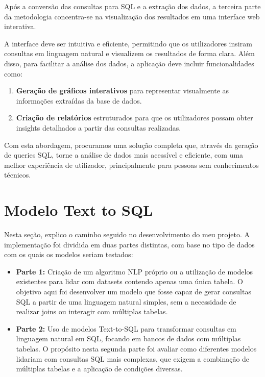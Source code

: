 \documentclass{article}
\begin{document}
\hspace*{1em} Após a conversão das consultas para SQL e a extração dos dados, a terceira parte da metodologia concentra-se na visualização dos resultados em uma interface web interativa.

A interface deve ser intuitiva e eficiente, permitindo que os utilizadores insiram consultas em linguagem natural e visualizem os resultados de forma clara. Além disso, para facilitar a análise dos dados, a aplicação deve incluir funcionalidades como:

\begin{enumerate}
    \item \textbf{Geração de gráficos interativos} para representar visualmente as informações extraídas da base de dados.
    \item \textbf{Criação de relatórios} estruturados para que os utilizadores possam obter insights detalhados a partir das consultas realizadas.
\end{enumerate}

Com esta abordagem, procuramos uma solução completa que, através da geração de queries SQL, torne a análise de dados mais acessível e eficiente, com uma melhor experiência de utilizador, principalmente para pessoas sem conhecimentos técnicos.


\section{Modelo Text to SQL}

\hspace*{1em} Nesta seção, explico o caminho seguido no desenvolvimento do meu projeto. A implementação foi dividida em duas partes distintas, com base no tipo de dados com os quais os modelos seriam testados:

\begin{itemize}
    \item \textbf{Parte 1:} Criação de um algoritmo NLP próprio ou a utilização de modelos existentes para lidar com datasets contendo apenas uma única tabela. O objetivo aqui foi desenvolver um modelo que fosse capaz de gerar consultas SQL a partir de uma linguagem natural simples, sem a necessidade de realizar joins ou interagir com múltiplas tabelas.
    \item \textbf{Parte 2:} Uso de modelos Text-to-SQL para transformar consultas em linguagem natural em SQL, focando em bancos de dados com múltiplas tabelas. O propósito nesta segunda parte foi avaliar como diferentes modelos lidariam com consultas SQL mais complexas, que exigem a combinação de múltiplas tabelas e a aplicação de condições diversas.
\end{itemize}
\end{document}
